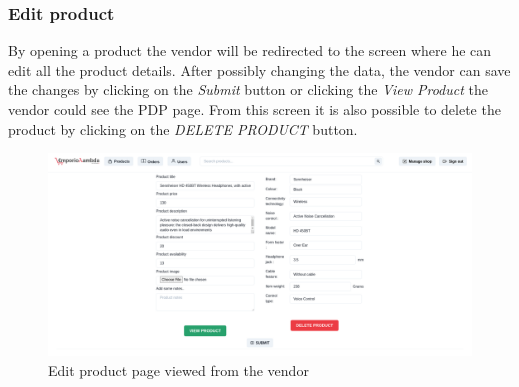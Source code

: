 \subsubsection{Edit product}
By opening a product the vendor will be redirected to the screen where he can edit all the product details. After possibly changing the data, the vendor can save the changes by clicking on the \textit{Submit} button or clicking the \textit{View Product} the vendor could see the PDP page. From this screen it is also possible to delete the product by clicking on the \textit{DELETE PRODUCT} button.
\begin{figure}[!ht]
    \caption{Edit product page viewed from the vendor}
    \vspace{5px}
    \includegraphics[scale=0.25]{../../../../Images/userManual/editProductVendor.png}
    \centering
\end{figure}
